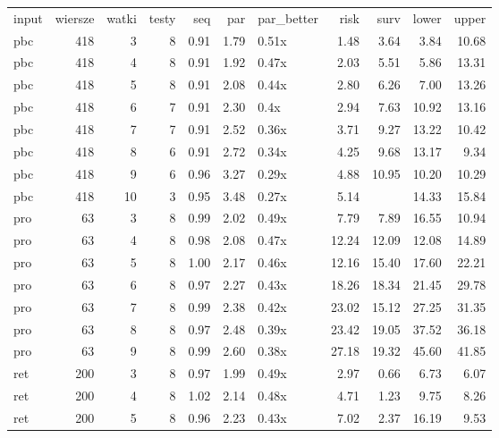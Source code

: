 \begin{table}[ht]
\centering
\begin{tabular}{lrrrrrlrrrr}
 input & wiersze & watki & testy & seq & par & par\_better & risk & surv & lower & upper \\ 
 pbc & 418 &   3 &   8 & 0.91 & 1.79 & 0.51x & 1.48 & 3.64 & 3.84 & 10.68 \\ 
   \hline
pbc & 418 &   4 &   8 & 0.91 & 1.92 & 0.47x & 2.03 & 5.51 & 5.86 & 13.31 \\ 
   \hline
pbc & 418 &   5 &   8 & 0.91 & 2.08 & 0.44x & 2.80 & 6.26 & 7.00 & 13.26 \\ 
   \hline
pbc & 418 &   6 &   7 & 0.91 & 2.30 & 0.4x & 2.94 & 7.63 & 10.92 & 13.16 \\ 
   \hline
pbc & 418 &   7 &   7 & 0.91 & 2.52 & 0.36x & 3.71 & 9.27 & 13.22 & 10.42 \\ 
   \hline
pbc & 418 &   8 &   6 & 0.91 & 2.72 & 0.34x & 4.25 & 9.68 & 13.17 & 9.34 \\ 
   \hline
pbc & 418 &   9 &   6 & 0.96 & 3.27 & 0.29x & 4.88 & 10.95 & 10.20 & 10.29 \\ 
   \hline
pbc & 418 &  10 &   3 & 0.95 & 3.48 & 0.27x & 5.14 &  & 14.33 & 15.84 \\ 
   \hline
pro &  63 &   3 &   8 & 0.99 & 2.02 & 0.49x & 7.79 & 7.89 & 16.55 & 10.94 \\ 
   \hline
pro &  63 &   4 &   8 & 0.98 & 2.08 & 0.47x & 12.24 & 12.09 & 12.08 & 14.89 \\ 
   \hline
pro &  63 &   5 &   8 & 1.00 & 2.17 & 0.46x & 12.16 & 15.40 & 17.60 & 22.21 \\ 
   \hline
pro &  63 &   6 &   8 & 0.97 & 2.27 & 0.43x & 18.26 & 18.34 & 21.45 & 29.78 \\ 
   \hline
pro &  63 &   7 &   8 & 0.99 & 2.38 & 0.42x & 23.02 & 15.12 & 27.25 & 31.35 \\ 
   \hline
pro &  63 &   8 &   8 & 0.97 & 2.48 & 0.39x & 23.42 & 19.05 & 37.52 & 36.18 \\ 
   \hline
pro &  63 &   9 &   8 & 0.99 & 2.60 & 0.38x & 27.18 & 19.32 & 45.60 & 41.85 \\ 
   \hline
ret & 200 &   3 &   8 & 0.97 & 1.99 & 0.49x & 2.97 & 0.66 & 6.73 & 6.07 \\ 
   \hline
ret & 200 &   4 &   8 & 1.02 & 2.14 & 0.48x & 4.71 & 1.23 & 9.75 & 8.26 \\ 
   \hline
ret & 200 &   5 &   8 & 0.96 & 2.23 & 0.43x & 7.02 & 2.37 & 16.19 & 9.53 \\ 

\end{tabular}
\end{table}
